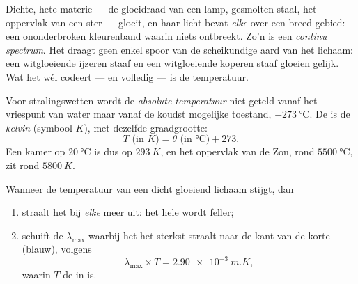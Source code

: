 \begin{definition}\label{def:g10:light-spectra:continuous}
Dichte, hete materie --- de gloeidraad van een lamp, gesmolten staal, het
oppervlak van een ster --- gloeit, en haar licht bevat \emph{elke}
 over een breed gebied: een ononderbroken kleurenband waarin
niets ontbreekt. Zo'n  is een \emph{continu spectrum}. Het draagt geen enkel spoor van de scheikundige aard van het
lichaam: een witgloeiende ijzeren staaf en een witgloeiende koperen staaf
gloeien gelijk. Wat het wél codeert --- en volledig --- is de
temperatuur.
\end{definition}

\begin{definition}\label{def:g10:light-spectra:kelvin}
Voor stralingswetten wordt de \emph{absolute
temperatuur} niet geteld vanaf het vriespunt
van water maar vanaf de koudst mogelijke toestand,
$\qty{-273}{\degreeCelsius}$. De  is de
\emph{kelvin} (symbool $\unit{K}$), met dezelfde
graadgrootte:
\[
T \text{ (in } \unit{K}) = \theta \text{ (in } \unit{\degreeCelsius}) + 273 .
\]
Een kamer op $\qty{20}{\degreeCelsius}$ is dus op $\qty{293}{K}$, en het
oppervlak van de Zon, rond $\qty{5500}{\degreeCelsius}$, zit rond
$\qty{5800}{K}$.
\end{definition}

\begin{proposition}\label{prop:g10:light-spectra:wien}
Wanneer de temperatuur van een dicht gloeiend lichaam stijgt, dan
\begin{enumerate}
  \item straalt het bij \emph{elke}  meer uit: het hele
         wordt feller;
  \item schuift de  $\lambda_{\max}$ waarbij het het sterkst
        straalt naar de kant van de korte  (blauw), volgens
        \[
        \lambda_{\max} \times T = \qty{2.90e-3}{m.K},
        \]
        waarin $T$ de  in  is.
\end{enumerate}
\end{proposition}
\admitted

